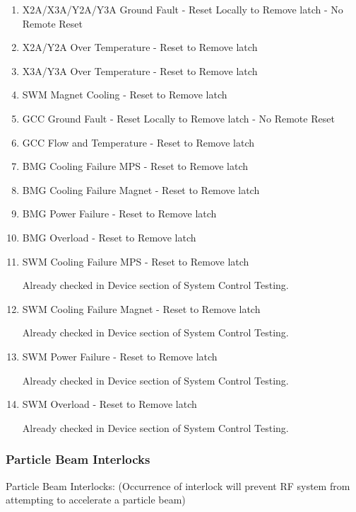 \documentclass[11pt]{book}		%
\begin{document}
\begin{enumerate}
 \item X2A/X3A/Y2A/Y3A Ground Fault - Reset Locally to Remove latch - No Remote Reset
 \item X2A/Y2A Over Temperature - Reset to Remove latch
 \item X3A/Y3A Over Temperature - Reset to Remove latch
 \item SWM Magnet Cooling - Reset to Remove latch
 \item GCC Ground Fault - Reset Locally to Remove latch - No Remote Reset
 \item GCC Flow and Temperature - Reset to Remove latch
 \item BMG Cooling Failure MPS - Reset to Remove latch
 \item BMG Cooling Failure Magnet - Reset to Remove latch
 \item BMG Power Failure - Reset to Remove latch
 \item BMG Overload - Reset to Remove latch
 \item SWM Cooling Failure MPS - Reset to Remove latch

\color{red}
Already checked in Device section of System Control Testing.
\color{black}

 \item SWM Cooling Failure Magnet - Reset to Remove latch

\color{red}
Already checked in Device section of System Control Testing.
\color{black}

 \item SWM Power Failure - Reset to Remove latch

\color{red}
Already checked in Device section of System Control Testing.
\color{black}

 \item SWM Overload - Reset to Remove latch

\color{red}
Already checked in Device section of System Control Testing.
\color{black}

\end{enumerate}

\subsubsection{Particle Beam Interlocks}

Particle Beam Interlocks:
(Occurrence of interlock will prevent RF system from attempting to accelerate a particle beam)
\end{document}
